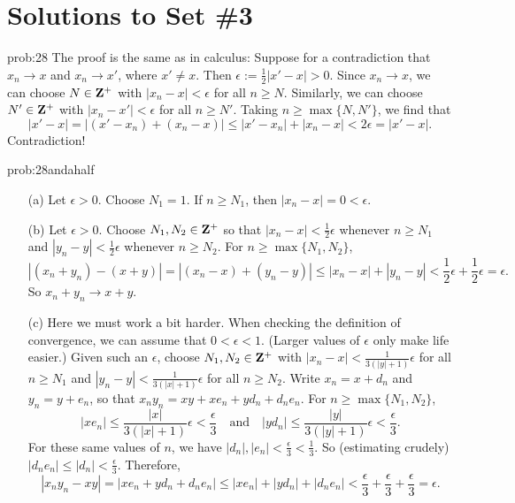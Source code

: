 
\chapter*{Solutions to Set \#3}
\label{set2sols}



\begin{sol}{prob:28}  The proof is the same as in calculus: Suppose for a contradiction that $x_n\to x$ and $x_n \to x'$, where $x' \ne x$. Then $\epsilon := \frac{1}{2}|x'-x| > 0$. Since $x_n\to x$, we can choose $N \in \mathbf{Z}^{+}$  with $|x_n-x| < \epsilon$ for all $n\ge N$. Similarly, we can choose $N' \in \mathbf{Z}^{+}$ with $|x_n-x'| < \epsilon$ for all $n \ge N'$. Taking $n\ge \max\{N,N'\}$, we find that
\[ |x'-x| = |(x'-x_n) + (x_n-x)| \le |x'-x_n| + |x_n-x| < 2\epsilon= |x'-x|. \]
Contradiction! 
\end{sol}


\begin{sol}{prob:28andahalf}
\begin{enumerate}
\item[(a)]  Let $\epsilon > 0$. Choose $N_1=1$. If $n \ge N_1$, then $|x_n-x| = 0 < \epsilon$.
\item[(b)]  Let $\epsilon > 0$. Choose $N_1, N_2 \in \mathbf{Z}^{+}$ so that $|x_n-x| < \frac{1}{2}\epsilon$ whenever $n\ge N_1$ and $|y_n-y| < \frac{1}{2}\epsilon$ whenever $n \ge N_2$. For $n\ge \max\{N_1, N_2\}$, 
\[ |(x_n+y_n)-(x+y)| = |(x_n-x) + (y_n-y)| \le |x_n-x| + |y_n-y| < \frac{1}{2}\epsilon + \frac{1}{2}\epsilon = \epsilon. \]
So $x_n+y_n\to x+y$.  
\item[(c)] Here we must work a bit harder. When checking the definition of convergence, we can assume that $0 < \epsilon < 1$. (Larger values of $\epsilon$ only make life easier.) Given such an $\epsilon$, choose $N_1, N_2 \in \mathbf{Z}^{+}$ with $|x_n-x| < \frac{1}{3(|y|+1)}\epsilon$ for all $n\ge N_1$ and $|y_n-y| < \frac{1}{3(|x|+1)} \epsilon$ for all $n\ge N_2$. Write $x_n = x + d_n$ and $y_n = y + e_n$, so that 
$x_n y_n = xy + x e_n + y d_n + d_n e_n$. For $n\ge \max\{N_1, N_2\}$,
\[ |x e_n| \le \frac{|x|}{3(|x|+1)} \epsilon < \frac{\epsilon}{3}\quad\text{and}\quad |y d_n| \le \frac{|y|}{3(|y|+1)} \epsilon < \frac{\epsilon}{3}. \]
For these same values of $n$, we have $|d_n|, |e_n| < \frac{\epsilon}{3} < \frac{1}{3}$. So (estimating crudely) $|d_n e_n| \le |d_n| < \frac{\epsilon}{3}$. Therefore,
\[ |x_n y_n - xy| = |x e_n + y d_n + d_n e_n|\le |xe_n| + |yd_n| + |d_n e_n| < \frac{\epsilon}{3} + \frac{\epsilon}{3} + \frac{\epsilon}{3} = \epsilon.\]
\end{enumerate}
\end{sol}


